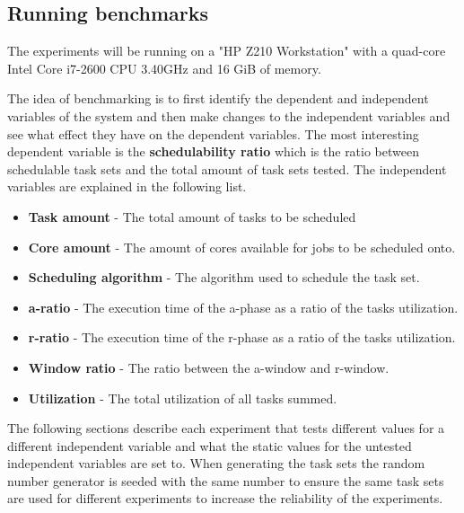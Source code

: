 \documentclass{kththesis}
\begin{document}
\subsection{Running benchmarks}\label{subsec:running_benchmarks}

The experiments will be running on a "HP Z210 Workstation" with a quad-core Intel Core i7-2600 CPU
\@3.40GHz and 16 GiB of memory.

The idea of benchmarking is to first identify the dependent and independent variables of the system
and then make changes to the independent variables and see what effect they have on the dependent
variables. The most interesting dependent variable is the \textbf{schedulability ratio} which is the
ratio between schedulable task sets and the total amount of task sets tested. The independent
variables are explained in the following list.

\begin{itemize}

    \item \textbf{Task amount} - The total amount of tasks to be scheduled
    \item \textbf{Core amount} - The amount of cores available for jobs to be scheduled onto.
    \item \textbf{Scheduling algorithm} - The algorithm used to schedule the task set.
    \item \textbf{\acrshort{a}-ratio} - The execution time of the \acrshort{a}-phase as a ratio of
        the tasks utilization.
    \item \textbf{\acrshort{r}-ratio} - The execution time of the \acrshort{r}-phase as a ratio of
        the tasks utilization.
    \item \textbf{Window ratio} - The ratio between the \acrshort{a}-window and \acrshort{r}-window.
    \item \textbf{Utilization} - The total utilization of all tasks summed.

\end{itemize}


The following sections describe each experiment that tests different values for a different independent variable and
what the static values for the untested independent variables are set to. When generating the task
sets the random number generator is seeded with the same number to ensure the same task sets are
used for different experiments to increase the reliability of the experiments. 
\end{document}
